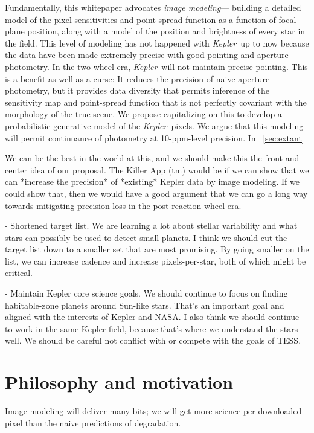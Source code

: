 \documentclass[12pt]{article}
\newcommand{\observatory}[1]{\textsl{#1}}
\newcommand{\kepler}{\observatory{Kepler}}
\newcommand{\Kepler}{\kepler}
\begin{document}
Fundamentally, this whitepaper advocates \emph{image modeling}---%
  building a detailed model of the pixel sensitivities and point-spread function
  as a function of focal-plane position,
  along with a model of the position and brightness of every star in the field.
This level of modeling has not happened with \Kepler\ up to now
  because the data have been made extremely precise with good pointing
  and aperture photometry.
In the two-wheel era, \Kepler\ will not maintain precise pointing.
This is a benefit as well as a curse:
It reduces the precision of naive aperture photometry,
  but it provides data diversity that permits inference
  of the sensitivity map and point-spread function
  that is not perfectly covariant with the morphology of the true scene.
We propose capitalizing on this to develop a probabilistic generative model of the \Kepler\ pixels.
We argue that this modeling will permit continuance of photometry at 10-ppm-level precision.
In \sectionname~\ref{sec:extant}


We can be the best in the world at this, and we should make this the front-and-center idea of our proposal.  The Killer App (tm) would be if we can show that we can *increase the precision* of *existing* Kepler data by image modeling.  If we could show that, then we would have a good argument that we can go a long way towards mitigating precision-loss in the post-reaction-wheel era.



- Shortened target list.  We are learning a lot about stellar variability and what stars can possibly be used to detect small planets.  I think we should cut the target list down to a smaller set that are most promising.  By going smaller on the list, we can increase cadence and increase pixels-per-star, both of which might be critical.

- Maintain Kepler core science goals.  We should continue to focus on finding habitable-zone planets around Sun-like stars.  That's an important goal and aligned with the interests of Kepler and NASA.  I also think we should continue to work in the same Kepler field, because that's where we understand the stars well.  We should be careful not conflict with or compete with the goals of TESS.


\section{Philosophy and motivation}

Image modeling will deliver many bits; we will get more science per
downloaded pixel than the naive predictions of degradation.
\end{document}
